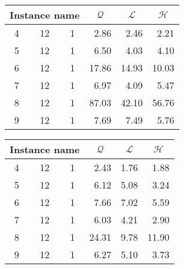 \begin{table}[H]
\centering
	\begin{tabular}{cccrrr}
		\multicolumn{3}{c}{Instance name}
					& \multicolumn{1}{c}{$\mathcal{Q}$}
									& \multicolumn{1}{c}{$\mathcal{L}$}
													& \multicolumn{1}{c}{$\mathcal{H}$} \\
		\midrule
		 4 & 12 & 1	&  2.86			&  2.46			&  2.21 \\
		 5 & 12 & 1	&  6.50			&  4.03			&  4.10 \\
		 6 & 12 & 1	& 17.86			& 14.93			& 10.03 \\
		 7 & 12 & 1	&  6.97			&  4.09			&  5.47 \\
		 8 & 12 & 1	& 87.03			& 42.10			& 56.76 \\
		 9 & 12 & 1	&  7.69			&  7.49			&  5.76 \\
	\end{tabular}
	\quad
	\begin{tabular}{cccrrr}
		\multicolumn{3}{c}{Instance name}
					& \multicolumn{1}{c}{$\mathcal{Q}$}
									& \multicolumn{1}{c}{$\mathcal{L}$}
													& \multicolumn{1}{c}{$\mathcal{H}$} \\
		\midrule
		 4 & 12 & 1	&  2.43			&  1.76			&  1.88 \\
		 5 & 12 & 1	&  6.12			&  5.08			&  3.24 \\
		 6 & 12 & 1	&  7.66			&  7.02			&  5.59 \\
		 7 & 12 & 1	&  6.03			&  4.21			&  2.90 \\
		 8 & 12 & 1	& 24.31			&  9.78			& 11.90 \\
		 9 & 12 & 1	&  6.27			&  5.10			&  3.73 \\
	\end{tabular}
	\label{table:benchmark:encoding-comparison}
\end{table}
